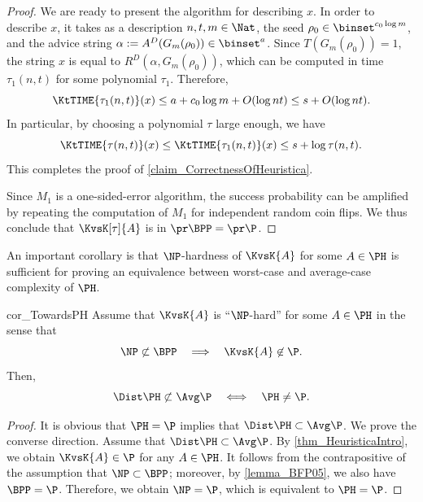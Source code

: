 \documentclass[11pt]{article}
\numberwithin{equation}{section}
\theoremstyle{definition}
\theoremstyle{plain}
\begin{document}
\begin{proof}
  We are ready to present the algorithm for describing $x$.
  In order to describe $x$, it takes as a description
  $n, t, m \in \Nat$,
  the seed $\rho_0 \in \binset^{c_0 \log m}$,
  and
  the advice string $\alpha := A^D(G_m(\rho_0)) \in \binset^a$.
  Since $T(G_m(\rho_0)) = 1$,
  the string $x$ is equal to $R^D(\alpha, G_m(\rho_0))$,
  which can be computed in time $\tau_1(n, t)$ for some polynomial $\tau_1$.
  Therefore,
  $$
    \KtTIME{\tau_1(n, t)}(x) \le a + c_0 \log m + O(\log n t) \le s + O(\log n t).
  $$
  In particular, by choosing a polynomial $\tau$ large enough, we have
  $$\KtTIME{\tau(n, t)}(x) \le \KtTIME{\tau_1(n, t)}(x) \le s + \log \tau(n, t).$$
  This completes the proof of \cref{claim_CorrectnessOfHeuristica}.

  Since $M_1$ is a one-sided-error algorithm, the success probability can be amplified by repeating the computation of $M_1$
  for independent random coin flips.
  We thus conclude that $\KvsK[\tau]{A}$ is in $\pr\BPP = \pr\P$.
\end{proof}

An important corollary is that $\NP$-hardness of $\KvsK{A}$ for some $A \in \PH$
is sufficient for proving an equivalence between worst-case and average-case complexity of $\PH$.
\begin{restatetheorem}
  {cor_TowardsPH}
  Assume that $\KvsK{A}$ is ``$\NP$-hard'' for some $A \in \PH$
  in the sense that
  $$
    \NP \not\subset \BPP
    \quad
    \Longrightarrow
    \quad
    \KvsK{A} \not\in \P.
  $$
  Then,
  $$
    \Dist\PH \not\subset \Avg\P
    \quad
    \Longleftrightarrow
    \quad
    \PH \neq \P.
  $$
\end{restatetheorem}
\begin{proof}
  It is obvious that $\PH = \P$ implies that $\Dist\PH \subset \Avg\P$.
  We prove the converse direction.
  Assume that $\Dist\PH \subset \Avg\P$.
  By \cref{thm_HeuristicaIntro},
  we obtain
  $\KvsK{A} \in \P$
  for any $A \in \PH$.
  It follows from the contrapositive of the assumption that
  $\NP \subset \BPP$;
  moreover, by \cref{lemma_BFP05}, we also have $\BPP = \P$.
  Therefore, we obtain $\NP = \P$, which is equivalent to $\PH = \P$.
\end{proof}
\end{document}
